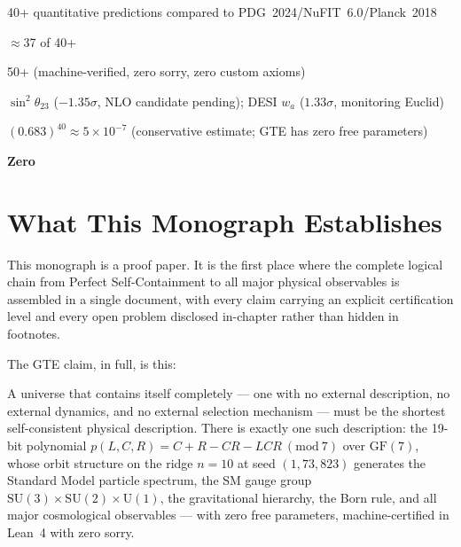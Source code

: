 \documentclass[11pt,openany]{book}
\theoremstyle{remark}
\newcommand{\CatA}{\textbf{A}}
\newcommand{\CatAL}{\ensuremath{\textbf{A}_{\rm Lean}}}
\begin{document}
\begin{tcolorbox}[colback=blue!5,colframe=blue!50!black,title={Meta-Statistics (\CatA)},breakable]
\begin{description}[leftmargin=3.5cm,labelwidth=3.3cm]
\item[Total predictions] 40+ quantitative predictions compared to PDG~2024/NuFIT~6.0/Planck~2018
\item[Within $1\sigma$] $\approx$37 of 40+
\item[$\CatAL$-certified results] 50+ (machine-verified, zero sorry, zero custom axioms)
\item[Disclosed tensions] $\sin^2\theta_{23}$ ($-1.35\sigma$, NLO candidate pending);
  DESI $w_a$ ($1.33\sigma$, monitoring Euclid)
\item[Probability of random match] $(0.683)^{40} \approx 5\times10^{-7}$ (conservative estimate; GTE has zero free parameters)
\item[Free parameters fitted to SM data] \textbf{Zero}
\end{description}
\end{tcolorbox}

\medskip
\section{What This Monograph Establishes}
\label{sec:roadmap}

This monograph is a proof paper.
It is the first place where the complete logical chain from Perfect Self-Containment
to all major physical observables is assembled in a single document, with every claim
carrying an explicit certification level and every open problem disclosed in-chapter
rather than hidden in footnotes.

The GTE claim, in full, is this:

\begin{tcolorbox}[colback=blue!5,colframe=blue!50!black,title={The GTE Claim}]
A universe that contains itself completely --- one with no external description, no
external dynamics, and no external selection mechanism --- must be the shortest
self-consistent physical description.
There is exactly one such description: the 19-bit polynomial
$p(L,C,R) = C + R - CR - LCR\ (\mathrm{mod}\ 7)$ over $\mathrm{GF}(7)$, whose
orbit structure on the
ridge $n = 10$ at seed $(1, 73, 823)$ generates the Standard Model particle spectrum,
the SM gauge group $\mathrm{SU}(3)\times\mathrm{SU}(2)\times\mathrm{U}(1)$, the
gravitational hierarchy, the Born rule, and all major cosmological observables ---
with zero free parameters, machine-certified in Lean~4 with zero sorry.
\end{tcolorbox}
\end{document}
